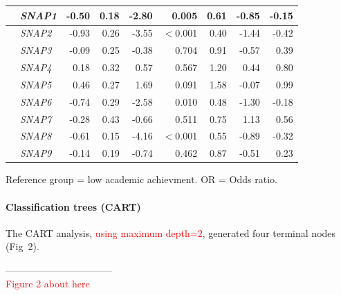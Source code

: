 \documentclass[10pt,letterpaper]{article}
\begin{document}
{{\begin{table}[H]
\begin{tabular}{|llrrrr|rrr|}
 \hline
  &  {\it SNAP1} & -0.50 & 0.18 & -2.80 & 0.005 & 0.61 &  -0.85 & -0.15  \\ 
  \hline
  &  {\it SNAP2} & -0.93 & 0.26 & -3.55 & $<$0.001 & 0.40 &  -1.44 & -0.42  \\ 
  \hline
  &  {\it SNAP3} & -0.09 & 0.25 & -0.38 & 0.704 & 0.91 &  -0.57 & 0.39  \\ 
  \hline
  &  {\it SNAP4} & 0.18 & 0.32 & 0.57& 0.567 & 1.20 &  0.44 & 0.80 \\ 
  \hline
  &  {\it SNAP5} & 0.46 & 0.27 & 1.69 & 0.091 & 1.58 &  -0.07 & 0.99  \\ 
  \hline 
  &  {\it SNAP6} & -0.74 & 0.29 & -2.58 & 0.010 & 0.48 &  -1.30 & -0.18  \\ 
   \hline
  &  {\it SNAP7} & -0.28 & 0.43 & -0.66 & 0.511 & 0.75 &   1.13 & 0.56  \\ 
  \hline
  &  {\it SNAP8} & -0.61 & 0.15 & -4.16 & $<$0.001 & 0.55 &  -0.89 & -0.32  \\ 
  \hline
  &  {\it SNAP9} & -0.14 & 0.19 & -0.74 & 0.462 & 0.87 &  -0.51 & 0.23  \\ 
   \hline

\end{tabular}
\begin{center}
Reference group = low academic achievment. OR = Odds ratio.\\ 
\end{center}
\end{table}
\vspace{5mm}


\paragraph{Classification trees (CART)}

 The CART analysis, \textcolor{red}{using  maximum depth=$2$},  generated four terminal nodes (Fig~2). 
 
\vspace{3mm}
 
\begin{center}
---------------------------------\\
 
\textcolor{red}{Figure 2 about here} \\
 

\end{center}}}
\end{document}

